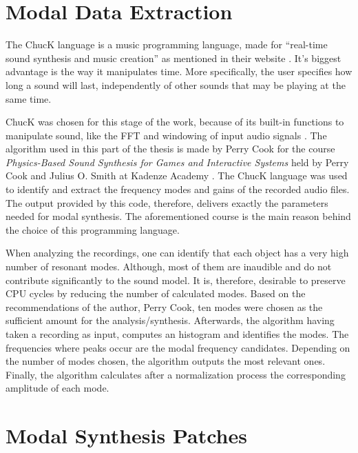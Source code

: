 \section{Modal Data Extraction}\label{sec:chuck}

The ChucK language is a music programming language, made for ``real-time sound synthesis and music creation'' as mentioned in their website \cite{bib:chuck}. It's biggest advantage is the way it manipulates time. More specifically, the user specifies how long a sound will last, independently of other sounds that may be playing at the same time.

ChucK was chosen for this stage of the work, because of its built-in functions to manipulate sound, like the \gls{FFT} and windowing of input audio signals \cite{bib:chuck_doc}. The algorithm used in this part of the thesis is made by Perry Cook for the course \textit{Physics-Based Sound Synthesis for Games and Interactive Systems} held by Perry Cook and Julius O. Smith at Kadenze Academy \cite{bib:physicsbasedcourse}. The ChucK language was used to identify and extract the frequency modes and gains of the recorded audio files. The output provided by this code, therefore, delivers exactly the parameters needed for modal synthesis. The aforementioned course is the main reason behind the choice of this programming language.

When analyzing the recordings, one can identify that each object has a very high number of resonant modes. Although, most of them are inaudible and do not contribute significantly to the sound model. It is, therefore, desirable to preserve \gls{CPU} cycles by reducing the number of calculated modes. Based on the recommendations of the author, Perry Cook, ten modes were chosen as the sufficient amount for the analysis/synthesis. Afterwards, the algorithm having taken a recording as input, computes an histogram and identifies the modes. The frequencies where peaks occur are the modal frequency candidates. Depending on the number of modes chosen, the algorithm outputs the most relevant ones. Finally, the algorithm calculates after a normalization process the corresponding amplitude of each mode.
 
\section{Modal Synthesis Patches}

